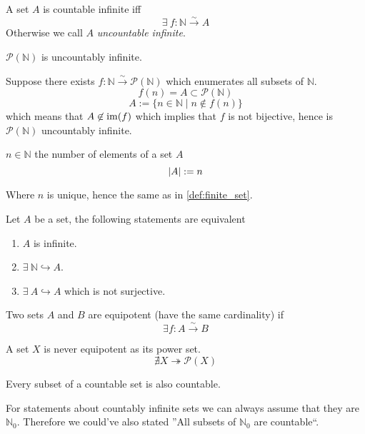 \begin{definition}
   A set \(A\) is countable infinite iff
   \[\exists~f: \mathbb{N} \xrightarrow{\sim} A\]
   Otherwise we call \(A\) \emph{uncountable infinite}.
\end{definition}
\begin{example}
   \(\mathcal{P}(\mathbb{N})\) is uncountably infinite.

   Suppose there exists \(f: \mathbb{N} \xrightarrow{\sim} \mathcal{P}(\mathbb{N})\) which enumerates all subsets of \(\mathbb{N}\).
   \[f(n) = A \subset \mathcal{P}(\mathbb{N})\]
   \[A := \{n \in \mathbb{N} \mid n \not\in f(n)\}\]
   which means that \(A \not\in \operatorname{im}(f)\) which implies that \(f\) is not bijective, hence is \(\mathcal{P}(\mathbb{N})\) uncountably infinite.
\end{example}

\begin{definition}[Cardinality]
   \(n \in \mathbb{N}\) the number of elements of a set \(A\)
   \[\left\lvert A\right\rvert := n \]
\end{definition}
\begin{remark}
   Where \(n\) is unique, hence the same as in \cref{def:finite_set}.
\end{remark}

\begin{proposition}
   Let \(A\) be a set, the following statements are equivalent
   \begin{enumerate}[label=\roman*, align=Center]
      \item \(A\) is infinite.
      \item \(\exists~\mathbb{N} \hookrightarrow A\).
      \item \(\exists~A \hookrightarrow A\) which is not surjective.
   \end{enumerate}
\end{proposition}

\begin{definition}
   Two sets \(A\) and \(B\) are equipotent (have the same cardinality) if
   \[\exists f: A \xrightarrow{\sim} B\]
\end{definition}

\begin{theorem}[Cantor]
   A set \(X\) is never equipotent as its power set.
   \[\nexists X \twoheadrightarrow \mathcal{P}(X)\]
\end{theorem}

\begin{proposition}
   Every subset of a countable set is also countable.
\end{proposition}
\begin{remark}
   For statements about countably infinite sets we can always assume that they are \(\mathbb{N}_0\).
   Therefore we could've also stated ''All subsets of \(\mathbb{N}_0\) are countable``.
\end{remark}

